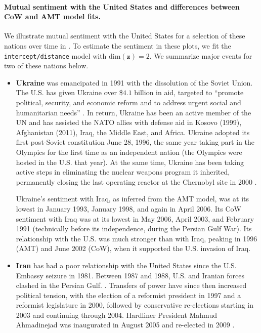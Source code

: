 \paragraph{Mutual sentiment with the United States and differences
 between CoW and AMT model fits.}
We illustrate mutual sentiment with the United States for a selection
of these nations over time in .
To estimate the sentiment in these plots, we fit the
\verb!intercept/distance! model with $\mbox{dim}(\bm z) = 2$.
We summarize major events for two of these nations below.
\begin{itemize}
  \item \textbf{Ukraine} was emancipated in 1991 with the dissolution
    of the Soviet Union.  The U.S. has given Ukraine over \$$4.1$
    billion in aid, targeted to ``promote political, security, and
    economic reform and to address urgent social and humanitarian
    needs'' \citep{ukrainestate:2012}.  In return, Ukraine has been an
    active member of the UN and has assisted the NATO allies with
    defense aid in Kosovo (1999), Afghanistan (2011), Iraq, the Middle
    East, and Africa.  Ukraine adopted its first post-Soviet
    constitution June 28, 1996, the same year taking part in the
    Olympics for the first time as an independent nation (the Olympics
    were hosted in the U.S. that year).  At the same time, Ukraine has
    been taking active steps in eliminating the nuclear weapons
    program it inherited, permanently closing the last operating
    reactor at the Chernobyl site in 2000 \citep{ukrainestate:2012}.

    Ukraine's sentiment with Iraq, as inferred from the AMT model, was
    at its lowest in January 1993, January 1998, and again in April
    2006.  Its CoW sentiment with Iraq was at its lowest in May 2006,
    April 2003, and February 1991 (technically before its
    independence, during the Persian Gulf War). Its relationship with
    the U.S. was much stronger than with Iraq, peaking in 1996 (AMT)
    and June 2002 (CoW), when it supported the U.S. invasion of Iraq.

  \item \textbf{Iran} has had a poor relationship with the United
    States since the U.S. Embassy seizure in 1981.  Between 1987 and
    1988, U.S. and Iranian forces clashed in the Persian Gulf.
    \citep{irancia:2012}.  Transfers of power have since then increased
    political tension, with the election of a reformist president in
    1997 and a reformist legislature in 2000, followed by conservative
    re-elections starting in 2003 and continuing through 2004.
    Hardliner President Mahmud Ahmadinejad was inaugurated
    in August 2005 and re-elected in 2009 \citep{irancia:2012}.


\end{itemize}
